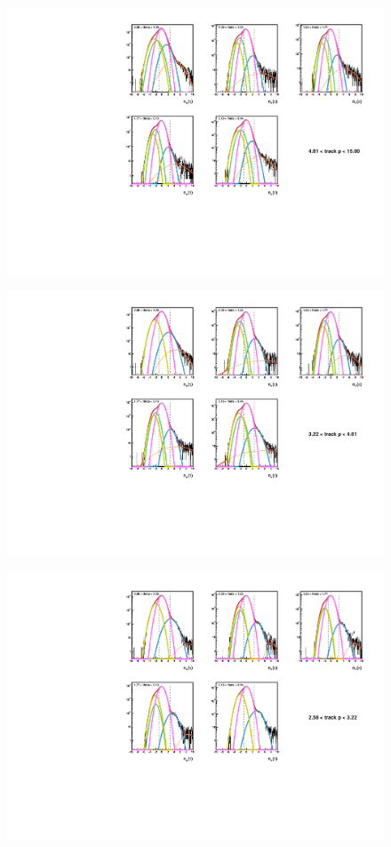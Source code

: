 \documentclass[abstract = on,listof=totoc, bibliography=totoc]{scrreprt}
\begin{document}
 \begin{figure}
\begin{center}
\includegraphics[width = .7\textwidth]{5gausFit_pbin_4.pdf}
\caption[]{}
\label{fig:5gaus4}
\end{center}
\end{figure}

 \begin{figure}
\begin{center}
\includegraphics[width = .7\textwidth]{5gausFit_pbin_3.pdf}
\caption[]{}
\label{fig:5gaus3}
\end{center}
\end{figure}

 \begin{figure}
\begin{center}
\includegraphics[width = .7\textwidth]{5gausFit_pbin_2.pdf}
\caption[]{}
\label{fig:5gaus2}
\end{center}
\end{figure}
\end{document}
